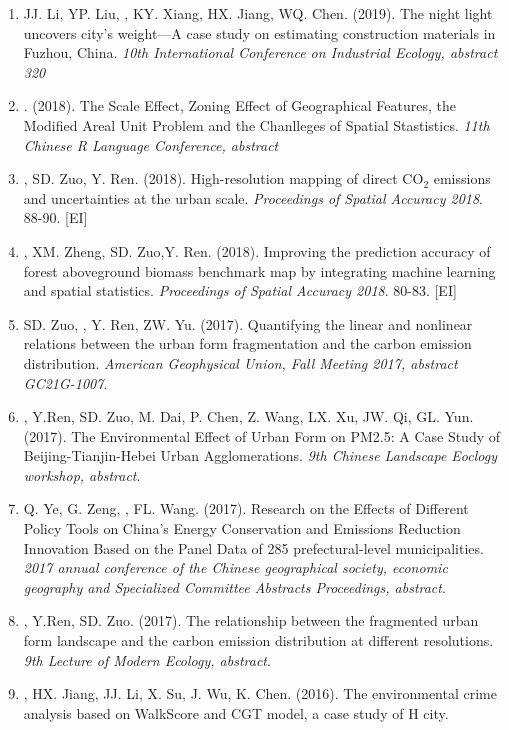 \begin{enumerate}
\item
    JJ. Li, YP. Liu, \Shaoqing, KY. Xiang, HX. Jiang, WQ. Chen. (2019).
    The night light uncovers city’s weight—A case study on estimating construction materials in Fuzhou, China.
    \textit{10th International Conference on Industrial Ecology, abstract 320}
\item
    \Shaoqing. (2018).
    The Scale Effect, Zoning Effect of Geographical Features, the Modified Areal Unit Problem and the Chanlleges of Spatial Stastistics.
    \textit{11th Chinese R Language Conference, abstract}
\item
    \Shaoqing, SD. Zuo, Y. Ren. (2018).
    High-resolution mapping of direct CO$_2$ emissions and uncertainties at the urban scale.
    \textit{Proceedings of Spatial Accuracy 2018}. 88-90. [EI]
\item
    \Shaoqing\CF, XM. Zheng, SD. Zuo,Y. Ren. (2018).
    Improving the prediction accuracy of forest aboveground biomass benchmark map by integrating machine learning and spatial statistics.
    \textit{Proceedings of Spatial Accuracy 2018}. 80-83. [EI]
\item
    SD. Zuo, \Shaoqing, Y. Ren, ZW. Yu. (2017).
    Quantifying the linear and nonlinear relations between the urban form fragmentation and the carbon emission distribution.
    \textit{American Geophysical Union, Fall Meeting 2017, abstract GC21G-1007}.
\item
    \Shaoqing, Y.Ren, SD. Zuo, M. Dai, P. Chen, Z. Wang, LX. Xu, JW. Qi, GL. Yun. (2017).
    The Environmental Effect of Urban Form on PM2.5: A Case Study of Beijing-Tianjin-Hebei Urban Agglomerations.
    \textit{9th Chinese Landscape Eoclogy workshop, abstract}.
\item
    Q. Ye, G. Zeng, \Shaoqing, FL. Wang. (2017).
    Research on the Effects of Different Policy Tools on China’s Energy Conservation and Emissions Reduction Innovation Based on the Panel Data of 285 prefectural-level municipalities.
    \textit{2017 annual conference of the Chinese geographical society, economic geography and Specialized Committee Abstracts Proceedings, abstract}.
\item
    \Shaoqing, Y.Ren, SD. Zuo. (2017).
    The relationship between the fragmented urban form landscape and the carbon emission distribution at different resolutions.
    \textit{9th Lecture of Modern Ecology, abstract}.
\item
    \Shaoqing, HX. Jiang, JJ. Li, X. Su, J. Wu, K. Chen. (2016).
    The environmental crime analysis based on WalkScore and CGT model, a case study of H city.

\end{enumerate}
